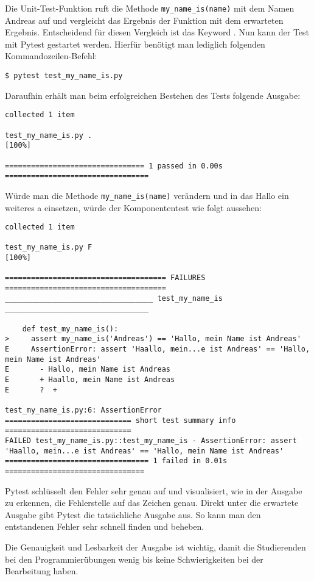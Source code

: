 Die Unit-Test-Funktion  ruft die Methode
\texttt{my\_name\_is(name)} mit dem Namen \glqq Andreas\grqq{} auf und
vergleicht das Ergebnis der Funktion mit dem erwarteten Ergebnis. Entscheidend
für diesen Vergleich ist das Keyword . Nun kann der Test mit
Pytest gestartet werden. Hierfür benötigt man lediglich folgenden
Kommandozeilen-Befehl:

\begin{lstlisting}[style=Bash]
    $ pytest test_my_name_is.py
\end{lstlisting}

Daraufhin erhält man beim erfolgreichen Bestehen des Tests folgende Ausgabe:

\begin{lstlisting}[style=Bash]
collected 1 item                                                               

test_my_name_is.py .                                                                  [100%]

================================ 1 passed in 0.00s =================================
\end{lstlisting}

Würde man die Methode \texttt{my\_name\_is(name)} verändern und in das
\glqq Hallo\grqq{} ein weiteres \glqq a\grqq{} einsetzen, würde der
Komponententest wie folgt aussehen:

\begin{lstlisting}[style=Bash]
collected 1 item                                                                                                                      

test_my_name_is.py F                                                                  [100%]

===================================== FAILURES =====================================
__________________________________ test_my_name_is _________________________________

    def test_my_name_is():
>     assert my_name_is('Andreas') == 'Hallo, mein Name ist Andreas'
E     AssertionError: assert 'Haallo, mein...e ist Andreas' == 'Hallo, mein Name ist Andreas'
E       - Hallo, mein Name ist Andreas
E       + Haallo, mein Name ist Andreas
E       ?  +

test_my_name_is.py:6: AssertionError
============================= short test summary info =============================
FAILED test_my_name_is.py::test_my_name_is - AssertionError: assert 'Haallo, mein...e ist Andreas' == 'Hallo, mein Name ist Andreas'
================================= 1 failed in 0.01s ================================
\end{lstlisting}

Pytest schlüsselt den Fehler sehr genau auf und visualisiert, wie in der Ausgabe
zu erkennen, die Fehlerstelle auf das Zeichen genau. Direkt unter die erwartete
Ausgabe gibt Pytest die tatsächliche Ausgabe aus. So kann man den entstandenen
Fehler sehr schnell finden und beheben.

Die Genauigkeit und Lesbarkeit der Ausgabe ist wichtig, damit die Studierenden
bei den Programmierübungen wenig bis keine Schwierigkeiten bei der Bearbeitung
haben.